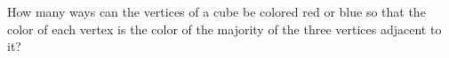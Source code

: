 How many ways can the vertices of a cube be colored red or blue so that the color of each vertex is the color of the majority of the three vertices adjacent to it?